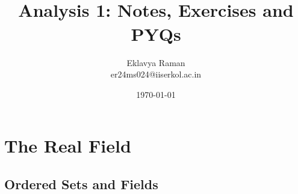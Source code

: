 \documentclass[openany]{book}
\begin{document}
\title{\Large{} \\ \vspace{5pt}
\large{Analysis 1: Notes, Exercises and PYQs}}
\author{Eklavya Raman \\ \vspace{5pt} er24ms024@iiserkol.ac.in \\ \vspace{5pt}}
\date{\today}
\maketitle
\tableofcontents
\listoftheorems[
    show=mytheorem,
    title={List of Theorems}]
\chapter{The Real Field}
\section{Ordered Sets and Fields}
\end{document}
